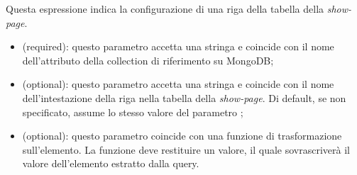Questa espressione indica la configurazione di una riga della tabella della \textit{show-page}.

\begin{itemize}

	\item \textbf{} (required): questo parametro accetta una stringa e coincide con il nome dell'attributo della collection di riferimento su MongoDB;
	\item \textbf{} (optional): questo parametro accetta una stringa e coincide con il nome dell'intestazione della riga nella tabella della \textit{show-page}. Di default, se non specificato, assume lo stesso valore del parametro ;
	\item \textbf{} (optional): questo parametro coincide con una funzione di trasformazione sull'elemento. La funzione deve restituire un valore, il quale sovrascriverà il valore dell'elemento estratto dalla query.

\end{itemize}



